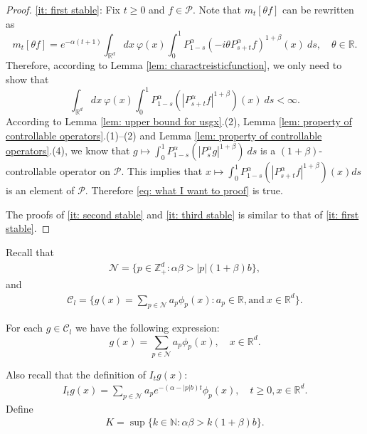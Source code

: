 \documentclass[12pt,a4paper]{amsart}
\theoremstyle{plain}
\theoremstyle{definition}
\numberwithin{equation}{section}
\begin{document}
\begin{proof}
    \eqref{it: first stable}:
	Fix $t\geq 0$ and $f\in \mathcal P$.
	Note that $m_t[\theta f]$ can be rewritten as
\[
    m_t[\theta f]= e^{-\alpha (t+1)}\int_{\mathbb R^d} dx~\varphi(x)\int_0^1 P_{1-s}^\alpha (-i\theta P_{s+t}^\alpha f)^{1+\beta}(x)~ds,
    \quad \theta \in \mathbb R.
\]
	Therefore, according to Lemma \ref{lem: charactreisticfunction}, we only need to show that
\begin{equation}
\label{eq: what I want to proof}
	\int_{\mathbb R^d} dx~\varphi(x)\int_0^1 P_{1-s}^\alpha (|P_{s+t}^\alpha f|^{1+\beta})(x)~ds < \infty.
\end{equation}
	According to Lemma \ref{lem: upper bound for usgx}.(2), Lemma \ref{lem: property of controllable operators}.(1)--(2) and Lemma \ref{lem: property of controllable operators}.(4),  we know that
$
	g \mapsto \int_0^1 P_{1-s}^\alpha (|P_{s}^\alpha g|^{1+\beta})~ds
$
	is a $(1+\beta)$-controllable operator on $\mathcal P$.
	This implies that $x \mapsto \int_0^1 P_{1-s}^\alpha (|P_{s+t}^\alpha f|^{1+\beta})(x) ds$ is an element of $\mathcal P$.
	Therefore \eqref{eq: what I want to proof} is true.

    The proofs of \eqref{it: second stable} and \eqref{it: third stable}  is similar to that of \eqref{it: first stable}.
\end{proof}
Recall that
\begin{align}
   \mathcal{N}=\{p\in \mathbb{Z}_+^d:  \alpha\beta>|p|(1+\beta)b\},
\end{align}
and
\begin{align}
    \mathcal{C}_l=\Big\{g(x)=\sum_{p\in\mathcal{N}}a_p\phi_p(x): a_p\in \mathbb{R}, \text{and}~ x\in\mathbb{R}^d \Big\}.
\end{align}

For each $g\in \mathcal{C}_l$ we have the following expression:
    $$g(x)=\sum_{p\in \mathcal{N}}a_p\phi_p(x), \quad x\in\mathbb{R}^d.$$

Also recall that the definition of $I_tg(x)$:
\begin{align}
    I_tg(x)=\sum_{p\in \mathcal{N}}a_pe^{-(\alpha-|p|b)t}\phi_p(x), \quad t\geq 0, x\in \mathbb{R}^d.
\end{align}
Define
\begin{align}
    K=\sup\{k\in \mathbb{N}: \alpha\beta>k(1+\beta)b\}.
\end{align}
\end{document}
